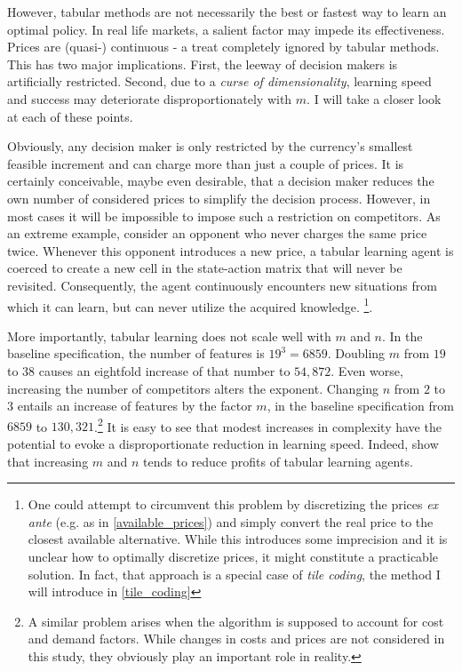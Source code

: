 However, tabular methods are not necessarily the best or fastest way to learn an optimal policy. In real life markets, a salient factor may impede its effectiveness. Prices are (quasi-) continuous - a treat completely ignored by tabular methods. This has two major implications. First, the leeway of decision makers is artificially restricted. Second, due to a \emph{curse of dimensionality}, learning speed and success may deteriorate disproportionately with $m$. I will take a closer look at each of these points.

Obviously, any decision maker is only restricted by the currency's smallest feasible increment and can charge more than just a couple of prices. It is certainly conceivable, maybe even desirable, that a decision maker reduces the own number of considered prices to simplify the decision process. However, in most cases it will be impossible to impose such a restriction on competitors. As an extreme example, consider an opponent who never charges the same price twice. Whenever this opponent introduces a new price, a tabular learning agent is coerced to create a new cell in the state-action matrix that will never be revisited. Consequently, the agent continuously encounters new situations from which it can learn, but can never utilize the acquired knowledge. \footnote{One could attempt to circumvent this problem by discretizing the prices \emph{ex ante} (e.g. as in \autoref{available_prices}) and simply convert the real price to the closest available alternative. While this introduces some imprecision and it is unclear how to optimally discretize prices, it might constitute a practicable solution. In fact, that approach is a special case of \emph{tile coding}, the method I will introduce in \autoref{tile_coding}}.

More importantly, tabular learning does not scale well with $m$ and $n$. In the baseline specification, the number of features is $19^3 = 6859$. Doubling $m$ from $19$ to $38$ causes an eightfold increase of that number to $54,872$. Even worse, increasing the number of competitors alters the exponent. Changing $n$ from $2$ to $3$ entails an increase of features by the factor $m$, in the baseline specification from $6859$ to $130,321$.\footnote{A similar problem arises when the algorithm is supposed to account for cost and demand factors. While changes in costs and prices are not considered in this study, they obviously play an important role in reality.} It is easy to see that modest increases in complexity have the potential to evoke a disproportionate reduction in learning speed. Indeed, \autocite{calvano_algorithmic_2018} show that increasing $m$ and $n$ tends to reduce profits of tabular learning agents.

